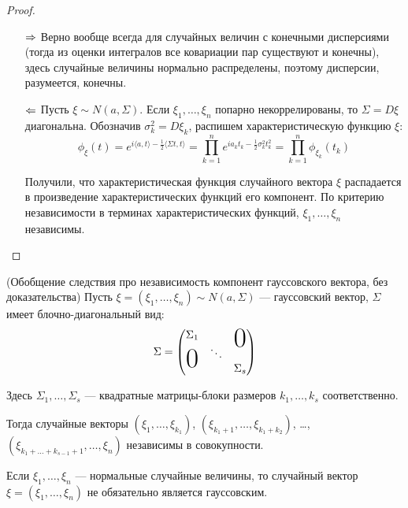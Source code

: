 \begin{proof}~
    \begin{itemize}
        \item[$\Rightarrow$] Верно вообще всегда для случайных величин с конечными дисперсиями (тогда из оценки интегралов все ковариации пар существуют и конечны), здесь случайные величины нормально распределены, поэтому дисперсии, разумеется, конечны.

        \item[$\Leftarrow$] Пусть $\xi \sim N(a, \Sigma)$. Если $\xi_1, \ldots, \xi_n$ попарно некоррелированы, то $\Sigma = D\xi$ диагональна. Обозначив $\sigma_k^2 = D \xi_k$, распишем характеристическую функцию $\xi$:
        \[
            \phi_\xi(t) = e^{i \langle a, t \rangle - \frac{1}{2} \langle \Sigma t, t \rangle} = \prod_{k=1}^n e^{i a_k t_k - \frac{1}{2} \sigma_k^2 t_k^2} = \prod_{k=1}^n \phi_{\xi_k}(t_k)
        \]

        Получили, что характеристическая функция случайного вектора $\xi$ распадается в произведение характеристических функций его компонент. По критерию независимости в терминах характеристических функций, $\xi_1, \ldots, \xi_n$ независимы.
    \end{itemize}
\end{proof}

\begin{corollary}  (Обобщение следствия про независимость компонент гауссовского вектора, без доказательства)
    Пусть $\xi = (\xi_1, \ldots, \xi_n) \sim N(a, \Sigma)$ --- гауссовский вектор, $\Sigma$ имеет блочно-диагональный вид:
    \[
        \Sigma = \begin{pmatrix}
            \Sigma_1 & & \bigzero \\
            \bigzero & \ddots & \\
             & & \Sigma_s
        \end{pmatrix}
    \]
    
    Здесь $\Sigma_1, \ldots, \Sigma_s$ --- квадратные матрицы-блоки размеров $k_1, \ldots, k_s$ соответственно.

    Тогда случайные векторы $(\xi_1, \ldots, \xi_{k_1})$, $(\xi_{k_1+1}, \ldots, \xi_{k_1+k_2})$, \ldots, $(\xi_{k_1 + \ldots + k_{s-1} +1}, \ldots, \xi_n)$ независимы в совокупности.
\end{corollary}

\begin{exercise}
    Если  $\xi_1, \ldots, \xi_n$ --- нормальные случайные величины, то случайный вектор $\xi = (\xi_1, \ldots, \xi_n)$ не обязательно является гауссовским.
\end{exercise}

